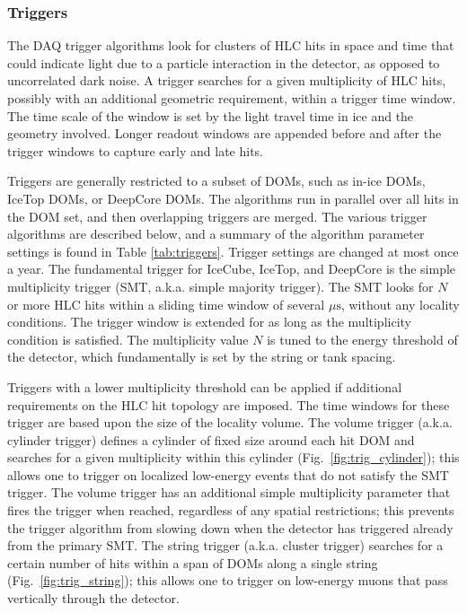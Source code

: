 \subsubsection{\label{sect:online:trigger}Triggers}

The DAQ trigger algorithms look for clusters of HLC hits in space and time
that could indicate light due to a particle interaction in the detector, as opposed
to uncorrelated dark noise.  A trigger searches for a given multiplicity of
HLC hits, possibly with an additional geometric requirement, within a
trigger time window.  The time scale of the window is set by the light
travel time in ice and the geometry involved. Longer readout windows 
are appended before and after the trigger windows to capture early and late
hits.

Triggers are generally restricted to a subset of DOMs, such as in-ice DOMs,
IceTop DOMs, or DeepCore DOMs.  The algorithms run in parallel over all
hits in the DOM set, and then overlapping triggers are merged.   The
various trigger algorithms are described below, and a summary of the
algorithm parameter settings is found in Table \ref{tab:triggers}.  Trigger
settings are changed at most once a year.
The fundamental trigger for IceCube, IceTop, and DeepCore is the simple
multiplicity trigger (SMT, a.k.a. simple majority trigger).  The
SMT looks for $N$ or more HLC hits within a sliding time window of several
$\mu\mathrm{s}$, without any locality conditions.  The trigger window is
extended for as long as the multiplicity condition is satisfied.
The multiplicity value $N$ is tuned to the energy threshold of the
detector, which fundamentally is set by the string or tank spacing. 

Triggers with a lower multiplicity threshold can be applied if additional requirements on the
HLC hit topology are imposed.  The time windows for these trigger are based upon the
size of the locality volume. The volume trigger (a.k.a. cylinder
  trigger) defines a cylinder of fixed size around each hit DOM and
searches for a given multiplicity within this cylinder
(Fig.~\ref{fig:trig_cylinder}); this allows one to trigger on localized
low-energy events that do not satisfy the SMT trigger.  The volume trigger
has an additional simple multiplicity parameter that fires the trigger when
reached, regardless of any spatial restrictions; this prevents the trigger
algorithm from slowing down when the detector has triggered already from
the primary SMT. The string trigger (a.k.a. cluster trigger) searches for a
certain number of hits within a span of DOMs along a single
string (Fig.~\ref{fig:trig_string}); this allows one to trigger on
low-energy muons that pass vertically 
through the detector.  

